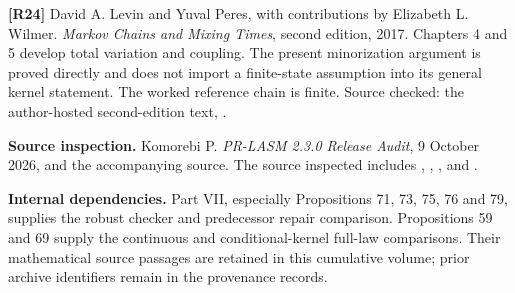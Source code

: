 \documentclass[11pt,oneside,openany]{book}
\numberwithin{equation}{section}
\begin{document}
\textbf{{[}R24{]}} David A. Levin and Yuval Peres, with contributions by
Elizabeth L. Wilmer. \emph{Markov Chains and Mixing Times}, second
edition, 2017. Chapters 4 and 5 develop total variation and coupling.
The present minorization argument is proved directly and does not import
a finite-state assumption into its general kernel statement. The worked
reference chain is finite. Source checked: the author-hosted
second-edition text,
.

\textbf{Source inspection.} Komorebi P. \emph{PR-LASM 2.3.0 Release Audit}, 9
October 2026, and the accompanying source. The source inspected includes
, ,
,  and
.

\textbf{Internal dependencies.} Part VII, especially Propositions 71,
73, 75, 76 and 79, supplies the robust checker and predecessor repair
comparison. Propositions 59 and 69 supply the continuous and
conditional-kernel full-law comparisons. Their mathematical source
passages are retained in this cumulative volume; prior archive
identifiers remain in the provenance records.

\endgroup
\end{document}
